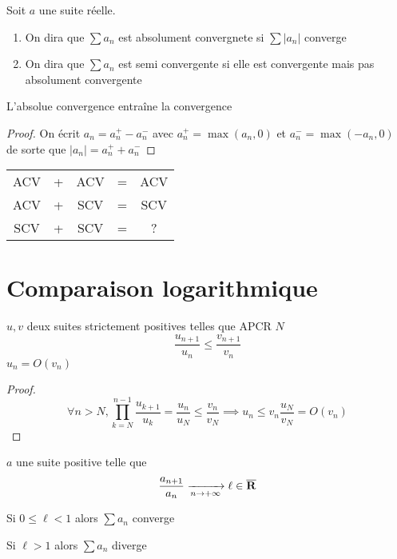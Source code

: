 \begin{dfn}
    Soit $a$ une suite réelle. \begin{enumerate}
        \item On dira que $\sum a_n$ est absolument convergnete si $\sum |a_n|$ converge
        \item On dira que $\sum a_n$ est semi convergente si elle est convergente mais pas absolument convergente
    \end{enumerate}
\end{dfn}

\begin{thm}
    L'absolue convergence entraîne la convergence
\end{thm}

\begin{proof}
    On écrit $a_n=a_n^+-a_n^-$ avec $a_n^+=\max(a_n, 0)$ et $a_n^-=\max(-a_n, 0)$ de sorte que $|a_n|=a_n^++a_n^-$
\end{proof}

\begin{rem}
    \begin{center}
    \begin{tabular}{ccccc}
        ACV & + & ACV & = & ACV\\
        ACV & + & SCV & = & SCV\\
        SCV & + & SCV & = & ?
    \end{tabular}
    \end{center}
\end{rem}

\section{Comparaison logarithmique}

\begin{prop}
    \Hyp $u, v$ deux suites strictement positives telles que APCR $N$ \[
    \frac{u_{n+1}}{u_n}\leq \frac{v_{n+1}}{v_n}
    \]
    \Conc $u_n=O(v_n)$
\end{prop}

\begin{proof}
    \[
        \forall n>N, \prod_{k=N}^{n-1}\frac{u_{k+1}}{u_k}=\frac{u_n}{u_N}\leq \frac{v_n}{v_N}\implies u_n\leq v_n\frac{u_N}{v_N}=O(v_n)
    \]
\end{proof}

\begin{thm}
    \Hyp $a$ une suite positive telle que \[
        \frac{a_{n+1}}{a_n}\xrightarrow[n\to+\infty]{}\ell\in\overline{\mathbf R}
    \]
    \begin{concenum}
    \item Si $0\leq \ell <1$ alors $\sum a_n$ converge
    \item Si $\ell>1$ alors $\sum a_n$ diverge
    \end{concenum}
\end{thm}

